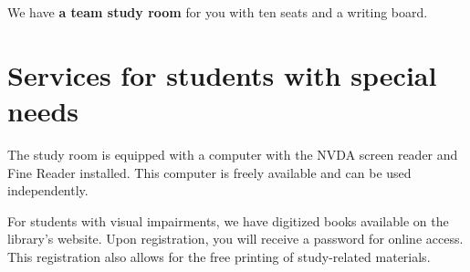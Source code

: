 


We have \textbf{a team study room} for you with ten seats and a writing board.





\bigskip
\ikonka{\faHeart}
\section{Services for students with special needs}

The study room is equipped with a computer with the NVDA screen reader and Fine
Reader installed. This computer is freely available and can be used
independently.


For students with visual impairments, we have digitized books available on the
library's website. Upon registration, you will receive a password for online
access. This registration also allows for the free printing of study-related
materials.

